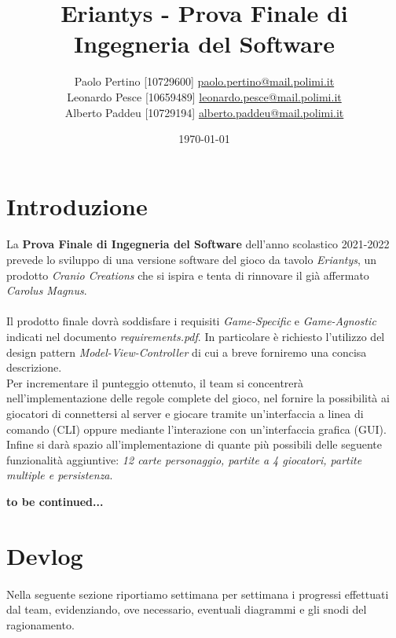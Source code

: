 \documentclass[a4paper, 12pt]{article}
\title{Eriantys - Prova Finale di Ingegneria del Software}
\author{
	Paolo Pertino [10729600]
	\href{mailto:paolo.pertino@mail.polimi.it}{paolo.pertino@mail.polimi.it} \\
	Leonardo Pesce [10659489]
	\href{mailto:leonardo.pesce@mail.polimi.it}{leonardo.pesce@mail.polimi.it} \\
	Alberto Paddeu [10729194]
	\href{mailto:alberto.paddeu@mail.polimi.it}{alberto.paddeu@mail.polimi.it} \\
}
\begin{document}
	\date{\today}
	\maketitle
	\newpage
	
	\tableofcontents
	
	\newpage
	\section{Introduzione}
	\paragraph{}
	La \textbf{Prova Finale di Ingegneria del Software} dell'anno scolastico 2021-2022 prevede lo sviluppo di una versione software del gioco da tavolo \emph{Eriantys}, un prodotto \emph{Cranio Creations}\cite{eriantys} che si ispira e tenta di rinnovare il già affermato \emph{Carolus Magnus}\cite{carolusMagnus}.
	
	\paragraph{}
	Il prodotto finale dovrà soddisfare i requisiti \emph{Game-Specific} e \emph{Game-Agnostic} indicati nel documento \emph{requirements.pdf}. In particolare è richiesto l'utilizzo del design pattern \emph{Model-View-Controller} di cui a breve forniremo una concisa descrizione.\\
	Per incrementare il punteggio ottenuto, il team si concentrerà nell'implementazione delle regole complete del gioco, nel fornire la possibilità ai giocatori di connettersi al server e giocare tramite un'interfaccia a linea di comando (CLI) oppure mediante l'interazione con un'interfaccia grafica (GUI). Infine si darà spazio all'implementazione di quante più possibili delle seguente funzionalità aggiuntive: \emph{12 carte personaggio, partite a 4 giocatori, partite multiple e persistenza}.
	
	\textbf{to be continued...}
	\newpage
	\section{Devlog}
	\paragraph{}
	Nella seguente sezione riportiamo settimana per settimana i progressi effettuati dal team, evidenziando, ove necessario, eventuali diagrammi e gli snodi del ragionamento.
\end{document}
